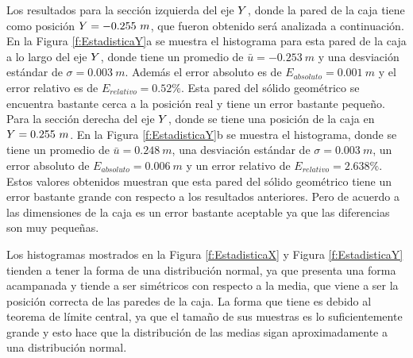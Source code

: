 
Los resultados para la sección izquierda del eje $\mathnormal Y$, donde la pared de 
la caja tiene como posición $\mathnormal Y = -0.255~m$, que fueron obtenido será analizada 
a continuación. En la Figura \ref{f:EstadisticaY}a se muestra el histograma para esta 
pared de la caja a lo largo del eje $\mathnormal Y$, donde tiene un promedio de 
$\bar{u} = -0.253~m$ y una desviación estándar de $\sigma = 0.003~m$. Además el error 
absoluto es de $E_{absoluto} = 0.001~m$ y el error relativo es de 
$E_{relativo} = 0.52\%$. Esta pared del sólido geométrico se encuentra bastante cerca 
a la posición real y tiene un error bastante pequeño. Para la sección derecha del eje 
$\mathnormal Y$, donde se tiene una posición de la caja en $\mathnormal Y = 0.255~m$. En la 
Figura \ref{f:EstadisticaY}b se muestra el histograma, donde se tiene un promedio 
de $\bar{u} = 0.248~m$, una desviación estándar de $\sigma = 0.003~m$, un error absoluto 
de $E_{absoluto} = 0.006~m$ y un error relativo de $E_{relativo} = 2.638\%$. Estos 
valores obtenidos muestran que esta pared del sólido geométrico tiene un error 
bastante grande con respecto a los resultados anteriores. Pero de acuerdo a las 
dimensiones de la caja es un error bastante aceptable ya que las diferencias son muy 
pequeñas.

Los histogramas mostrados en la Figura \ref{f:EstadisticaX} y Figura \ref{f:EstadisticaY}
tienden a tener la forma de una distribución normal, ya que presenta una forma acampanada
y tiende a ser simétricos con respecto a la media, que viene a ser la posición correcta 
de las paredes de la caja. La forma que tiene es debido al teorema de límite central, ya 
que el tamaño de sus muestras es lo suficientemente grande y esto hace que la distribución 
de las medias sigan aproximadamente a una distribución normal.

